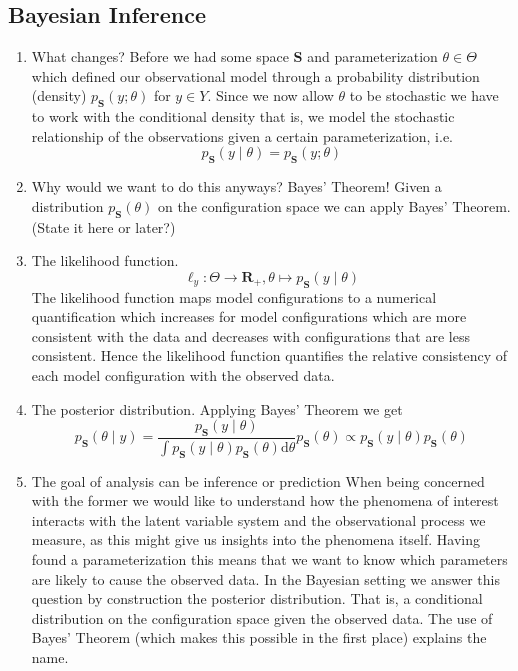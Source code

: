 \subsection*{Bayesian Inference}
\begin{enumerate}
  \item What changes? Before we had some space $\mathbf{S}$ and parameterization $\theta \in \Theta$ which defined our observational model through a probability distribution (density) $p_{\mathbf{S}}(y; \theta)$ for $y \in Y$.
    Since we now allow $\theta$ to be stochastic we have to work with the conditional density that is, we model the stochastic relationship of the observations given a certain parameterization, i.e. $$p_{\mathbf{S}}(y \mid \theta) = p_{\mathbf{S}}(y; \theta)$$
  \item Why would we want to do this anyways? Bayes' Theorem!
    Given a distribution $p_{\mathbf{S}}(\theta)$ on the configuration space we can apply Bayes' Theorem. (State it here or later?)
  \item The likelihood function.$$\ell_{y} : \Theta \to \mathbf{R}_+, \theta \mapsto p_{\mathbf{S}}(y \mid \theta)$$
    The likelihood function maps model configurations to a numerical quantification which increases for model configurations which are more consistent with the data and decreases with configurations that are less consistent.
    Hence the likelihood function quantifies the relative consistency of each model configuration with the observed data.
  \item The posterior distribution. Applying Bayes' Theorem we get $$p_{\mathbf{S}}(\theta \mid y) = \frac{p_{\mathbf{S}}(y \mid \theta)}{\int p_{\mathbf{S}}(y \mid \theta) p_{\mathbf{S}}(\theta) \mathrm{d}\theta} p_{\mathbf{S}} (\theta) \propto p_{\mathbf{S}}(y \mid \theta) p_{\mathbf{S}}(\theta)$$
  \item The goal of analysis can be inference or prediction
    When being concerned with the former we would like to understand how the phenomena of interest interacts with the latent variable system and the observational process we measure, as this might give us insights into the phenomena itself.
    Having found a parameterization this means that we want to know which parameters are likely to cause the observed data.
    In the Bayesian setting we answer this question by construction the posterior distribution.
    That is, a conditional distribution on the configuration space given the observed data.
    The use of Bayes' Theorem (which makes this possible in the first place) explains the name.

\end{enumerate}
